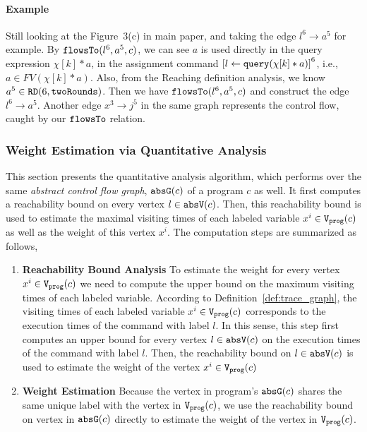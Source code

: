   \paragraph*{Example}
%
Still looking at the Figure~3(c) in main paper, 
and taking the edge $l^6 \to a^5$ for example.
By $\mathtt{flowsTo}(l^6, a^5, c)$, we can see $a$ is used directly in the query expression $\chi[k]*a$,
in the assignment command $\clabel{\assign{l}{\query(\chi[k]*a)}}^6$,
i.e., $a \in FV(\chi[k]*a)$.
Also, from the Reaching definition analysis, we know $a^5 \in \mathtt{RD}(6, \mathtt{twoRounds})$.
Then we have $\mathtt{flowsTo}(l^6, a^5, c)$ and construct the edge $l^6 \to a^5$.
Another edge $x^3 \to j^5$ in the same graph represents the control flow, caught by our $\mathtt{flowsTo}$ relation.
%

\subsubsection{Weight Estimation via Quantitative Analysis}
\label{sec:alg_weightgen}
%
This section presents the quantitative analysis algorithm, which performs over the same \emph{abstract control flow graph}, $\mathtt{abs}{\mathtt{G}}(c)$ of a program $c$ as well. 
It first computes a reachability bound on every vertex $l \in \mathtt{abs}{\mathtt{V}}(c)$.
Then,
this reachability bound is used to estimate the maximal visiting times of each labeled variable $x^i \in \mathtt{{V_{prog}}}(c)$ as well as the weight of this vertex $x^i$.
The computation steps are summarized as follows,
\begin{enumerate}
  \item \textbf{Reachability Bound Analysis}
  {
    To estimate the weight for every vertex $x^i \in \mathtt{{V_{prog}}}(c)$
    we need to compute the upper bound on the maximum visiting times of each labeled variable.
  According to Definition~\ref{def:trace_graph},
  the visiting times of each labeled variable $x^i \in \mathtt{{V_{prog}}}(c)$ corresponds to the execution times of the command with label $l$.
In this sense, this step first computes an upper bound for every vertex $l \in \mathtt{abs}{\mathtt{V}}(c)$
on the execution times of the command with label $l$. 
Then,
the reachability bound on $l \in \mathtt{abs}{\mathtt{V}}(c)$ is used to estimate the weight of the vertex $x^i \in \mathtt{{V_{prog}}}(c) $
  }
    \item \textbf{Weight Estimation}
    Because
    the vertex in program's $\mathtt{abs}{\mathtt{G}}(c)$ shares the same unique label with the vertex in $\mathtt{{V_{prog}}}(c)$, 
    we use the reachability bound on vertex in $\mathtt{abs}{\mathtt{G}}(c)$ directly to estimate the weight of the vertex in $\mathtt{{V_{prog}}}(c)$.
\end{enumerate}

